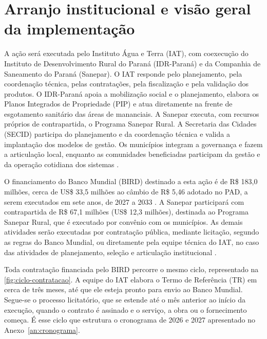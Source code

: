 \section{Arranjo institucional e visão geral da implementação}
\label{sec:arranjo}

A ação será executada pelo Instituto Água e Terra (IAT), com coexecução do
Instituto de Desenvolvimento Rural do Paraná (IDR-Paraná) e da Companhia de
Saneamento do Paraná (Sanepar). O IAT responde pelo planejamento, pela
coordenação técnica, pelas contratações, pela fiscalização e pela validação
dos produtos. O IDR-Paraná apoia a mobilização social e o planejamento,
elabora os Planos Integrados de Propriedade (PIP) e atua diretamente na
frente de esgotamento sanitário das áreas de mananciais. A Sanepar executa,
com recursos próprios de contrapartida, o Programa Sanepar Rural. A
Secretaria das Cidades (SECID) participa do planejamento e da coordenação
técnica e valida a implantação dos modelos de gestão. Os municípios integram a
governança e fazem a articulação local, enquanto as comunidades beneficiadas
participam da gestão e da operação cotidiana dos sistemas \cite{mop2026}.

O financiamento do Banco Mundial (BIRD) destinado a esta ação é de
R\$ 183,0 milhões, cerca de US\$ 33,5 milhões ao câmbio de R\$ 5,46 adotado
no PAD, a serem executados em sete anos, de 2027 a 2033 \cite{custo2026}. A
Sanepar participará com contrapartida de R\$ 67,1 milhões (US\$ 12,3
milhões), destinada ao Programa
Sanepar Rural, que é executado por convênio com os municípios. As demais
atividades serão executadas por contratação pública, mediante licitação,
segundo as regras do Banco Mundial, ou diretamente pela equipe técnica do
IAT, no caso das atividades de planejamento, seleção e articulação
institucional \cite{mop2026}.

Toda contratação financiada pelo BIRD percorre o mesmo ciclo, representado na
\autoref{fig:ciclo-contratacao}. A equipe do IAT elabora o Termo de Referência
(TR) em cerca de três meses, até que ele esteja pronto para envio ao Banco
Mundial. Segue-se o processo licitatório, que se estende até o mês anterior
ao início da execução, quando o contrato é assinado e o serviço, a obra ou o
fornecimento começa. É esse ciclo que estrutura o cronograma de 2026 e 2027
apresentado no Anexo~\ref{an:cronograma}.

